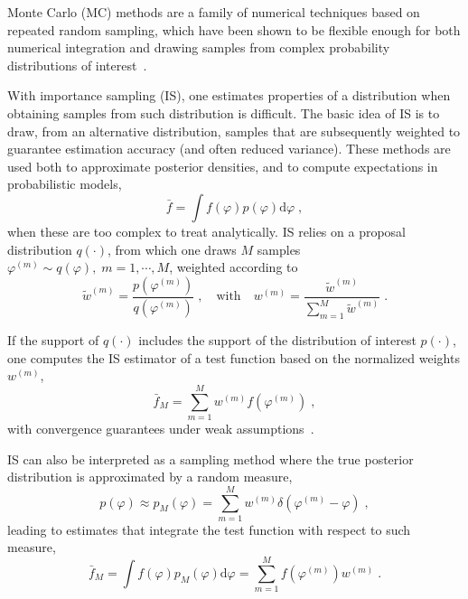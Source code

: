 
Monte Carlo (MC) methods are a family of numerical techniques based on repeated random sampling,
which have been shown to be flexible enough for both numerical integration and drawing samples from complex probability distributions of interest~\citep{b-Liu2001}.

With importance sampling (IS), one estimates properties of a distribution when obtaining samples from such distribution is difficult.
The basic idea of IS is to draw, from an alternative distribution,
samples that are subsequently weighted to guarantee estimation accuracy (and often reduced variance).
These methods are used both to approximate posterior densities,
and to compute expectations in probabilistic models, \ie
\begin{equation}
\bar{f}=\int f(\varphi) p(\varphi) \mathrm{d}\varphi \;,
\end{equation}
when these are too complex to treat analytically.
IS relies on a proposal distribution $q(\cdot)$,
from which one draws $M$ samples $\varphi^{(m)} \sim q(\varphi), \; m=1, \cdots , M$,
weighted according to
\begin{equation}
\widetilde{w}^{(m)}=\frac{p(\varphi^{(m)})}{q(\varphi^{(m)})} \;, \quad \text{with} \quad w^{(m)}=\frac{\widetilde{w}^{(m)}}{\sum_{m=1}^M\widetilde{w}^{(m)}} \; .
\end{equation}

If the support of $q(\cdot)$ includes the support of the distribution of interest $p(\cdot)$, one computes the IS estimator of a test function based on the normalized weights $w^{(m)}$,
\begin{equation}
\bar{f}_M=\sum_{m=1}^M w^{(m)} f\left(\varphi^{(m)}\right) \; ,
\end{equation}
with convergence guarantees under weak assumptions~\citep{b-Liu2001}.

IS can also be interpreted as a sampling method where the true posterior distribution is approximated by a random measure, \ie
\begin{equation}
p(\varphi) \approx p_M(\varphi) = \sum_{m=1}^M w^{(m)} \delta\left(\varphi^{(m)}-\varphi\right) \;,
\end{equation}
leading to estimates that integrate the test function with respect to such measure,
\begin{equation}
\bar{f}_M=\int f(\varphi) p_M(\varphi) \mathrm{d}\varphi =  \sum_{m=1}^M f\left(\varphi^{(m)}\right) w^{(m)} \; .
\end{equation}

